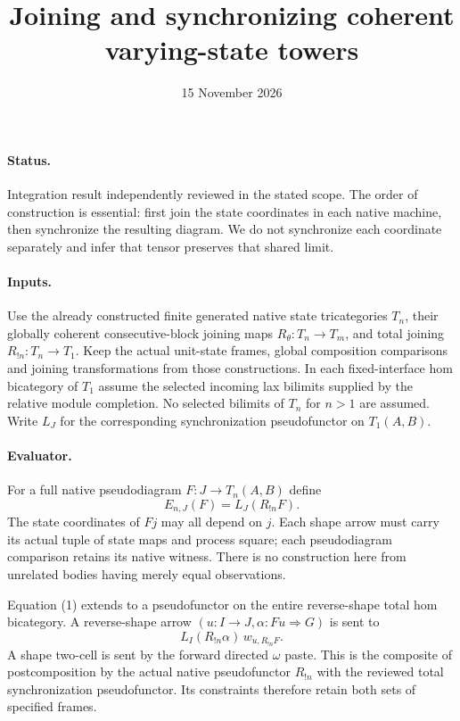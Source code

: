 \documentclass{article}
\title{Joining and synchronizing coherent varying-state towers}
\date{15 November 2026}
\begin{document}
\maketitle
\paragraph{Status.} Integration result independently reviewed in the stated scope. The order of construction is essential: first join the state coordinates in each native machine, then synchronize the resulting diagram. We do not synchronize each coordinate separately and infer that tensor preserves that shared limit.

\paragraph{Inputs.} Use the already constructed finite generated native state tricategories $T_n$, their globally coherent consecutive-block joining maps $R_\theta:T_n\to T_m$, and total joining $R_{!n}:T_n\to T_1$. Keep the actual unit-state frames, global composition comparisons and joining transformations from those constructions. In each fixed-interface hom bicategory of $T_1$ assume the selected incoming lax bilimits supplied by the relative module completion. No selected bilimits of $T_n$ for $n>1$ are assumed. Write $L_J$ for the corresponding synchronization pseudofunctor on $T_1(A,B)$.

\paragraph{Evaluator.} For a full native pseudodiagram $F:J\to T_n(A,B)$ define
\[
 E_{n,J}(F)=L_J(R_{!n}F).
\tag{1}
\]
The state coordinates of $Fj$ may all depend on $j$. Each shape arrow must carry its actual tuple of state maps and process square; each pseudodiagram comparison retains its native witness. There is no construction here from unrelated bodies having merely equal observations.

Equation (1) extends to a pseudofunctor on the entire reverse-shape total hom bicategory. A reverse-shape arrow $(u:I\to J,\alpha:Fu\Rightarrow G)$ is sent to
\[
 L_I(R_{!n}\alpha)\,w_{u,R_{!n}F}.
\]
A shape two-cell is sent by the forward directed $\omega$ paste. This is the composite of postcomposition by the actual native pseudofunctor $R_{!n}$ with the reviewed total synchronization pseudofunctor. Its constraints therefore retain both sets of specified frames.
\end{document}

